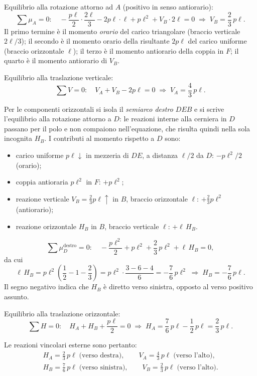 \medskip
\noindent Equilibrio alla rotazione attorno ad $A$
(positivo in senso antiorario):
\[
\sum \mu_A = 0:\quad
-\frac{p\ell}{2}\cdot\frac{2\ell}{3}
- 2p\ell\cdot\ell
+ p\ell^2
+ V_B\cdot 2\ell
= 0
\;\Rightarrow\;
V_B = \frac{2}{3}\,p\ell.
\]
Il primo termine è il momento \emph{orario} del
carico triangolare (braccio verticale $2\ell/3$);
il secondo è il momento orario della risultante
$2p\ell$ del carico uniforme (braccio orizzontale
$\ell$); il terzo è il momento antiorario della
coppia in $F$; il quarto è il momento antiorario
di $V_B$.

\medskip
\noindent Equilibrio alla traslazione verticale:
\[
\sum V = 0:\quad
V_A + V_B - 2p\ell = 0
\;\Rightarrow\;
V_A = \frac{4}{3}\,p\ell.
\]

\medskip
\noindent Per le componenti orizzontali si isola
il \emph{semiarco destro $DEB$} e si scrive
l'equilibrio alla rotazione attorno a $D$:
le reazioni interne alla cerniera in $D$ passano
per il polo e non compaiono nell'equazione,
che risulta quindi nella sola incognita $H_B$.
I contributi al momento rispetto a $D$ sono:

\begin{itemize}[noitemsep]
	\item carico uniforme $p\ell\downarrow$ in mezzeria
	di $DE$, a distanza $\ell/2$ da $D$:
	$-p\ell^2/2$ (orario);
	\item coppia antioraria $p\ell^2$ in $F$:
	$+p\ell^2$;
	\item reazione verticale $V_B = \tfrac{2}{3}p\ell\uparrow$
	in $B $, braccio orizzontale $\ell$:
	$+\tfrac{2}{3}p\ell^2$ (antiorario);
	\item reazione orizzontale $H_B$ in $B$,
	braccio verticale $\ell$:
	$+\ell\,H_B$.
\end{itemize}

\[
\sum \mu_D^{\text{destro}} = 0:\quad
-\frac{p\ell^2}{2}
+ p\ell^2
+ \frac{2}{3}\,p\ell^2
+ \ell\,H_B
= 0,
\]
da cui
\[
\ell\,H_B
= p\ell^2\!\left(\frac{1}{2} - 1 - \frac{2}{3}\right)
= p\ell^2\cdot\frac{3 - 6 - 4}{6}
= -\frac{7}{6}\,p\ell^2
\;\Rightarrow\;
H_B = -\frac{7}{6}\,p\ell.
\]
Il segno negativo indica che $H_B$ è diretto verso sinistra,
opposto al verso positivo assunto.

\medskip
\noindent Equilibrio alla traslazione orizzontale:
\[
\sum H = 0:\quad
H_A + H_B + \frac{p\ell}{2} = 0
\;\Rightarrow\;
H_A = \frac{7}{6}\,p\ell - \frac{1}{2}\,p\ell
= \frac{2}{3}\,p\ell.
\]

Le reazioni vincolari esterne sono pertanto:
\begin{equation}\label{eq:arco3c_reazioni}
	\begin{gathered}
		H_A = \frac{2}{3}\,p\ell
		\;\text{(verso destra)},
		\qquad
		V_A = \frac{4}{3}\,p\ell
		\;\text{(verso l'alto)},
		\\[4pt]
		H_B = \frac{7}{6}\,p\ell
		\;\text{(verso sinistra)},
		\qquad
		V_B = \frac{2}{3}\,p\ell
		\;\text{(verso l'alto)}.
	\end{gathered}
\end{equation}

